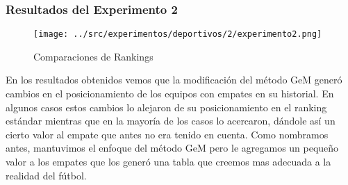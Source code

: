 \subsubsection{Resultados del Experimento 2}

\begin{figure}[ht]
\begin{center}
\texttt{[image: ../src/experimentos/deportivos/2/experimento2.png]}
\caption{Comparaciones de Rankings}
\end{center}
\end{figure}

\par En los resultados obtenidos vemos que la modificaci\'on del m\'etodo GeM gener\'o cambios en el posicionamiento de los equipos con empates en su historial. En algunos casos estos cambios lo alejaron de su posicionamiento en el ranking est\'andar mientras que en la mayor\'ia de los casos lo acercaron, d\'andole as\'i un cierto valor al empate que antes no era tenido en cuenta. Como nombramos antes, mantuvimos el enfoque del m\'etodo GeM pero le agregamos un pequeño valor a los empates que los gener\'o una tabla que creemos mas adecuada a la realidad del f\'utbol.

\newpage

